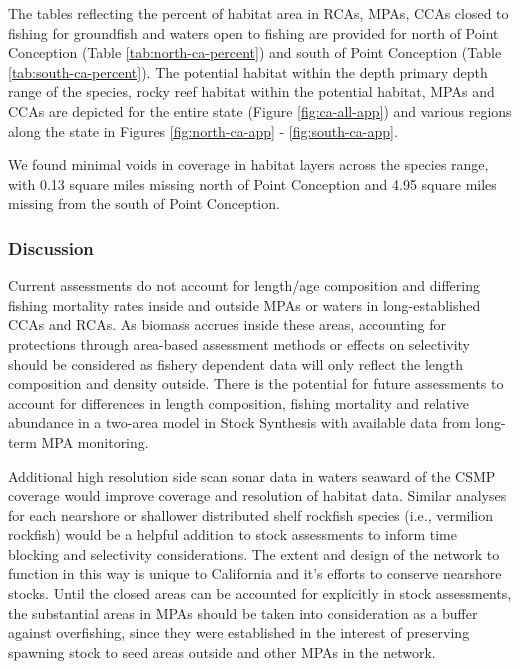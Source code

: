 \documentclass[11pt,
  english,
  a4paper,
]{article}
\begin{document}
The tables reflecting the percent of habitat area in RCAs, MPAs, CCAs closed to fishing for groundfish and waters open to fishing are provided for north of Point Conception (Table \ref{tab:north-ca-percent}) and south of Point Conception (Table \ref{tab:south-ca-percent}). The potential habitat within the depth primary depth range of the species, rocky reef habitat within the potential habitat, MPAs and CCAs are depicted for the entire state (Figure \ref{fig:ca-all-app}) and various regions along the state in Figures \ref{fig:north-ca-app} - \ref{fig:south-ca-app}.

\leavevmode\tagmcend\tagstructend\par


We found minimal voids in coverage in habitat layers across the species range, with 0.13 square miles missing north of Point Conception and 4.95 square miles missing from the south of Point Conception.

\leavevmode\tagmcend\tagstructend\par


\hypertarget{discussion}{%
\subsubsection{Discussion}\label{discussion}}

\leavevmode\tagmcend\tagstructend


Current assessments do not account for length/age composition and differing fishing mortality rates inside and outside MPAs or waters in long-established CCAs and RCAs. As biomass accrues inside these areas, accounting for protections through area-based assessment methods or effects on selectivity should be considered as fishery dependent data will only reflect the length composition and density outside. There is the potential for future assessments to account for differences in length composition, fishing mortality and relative abundance in a two-area model in Stock Synthesis with available data from long-term MPA monitoring.

\leavevmode\tagmcend\tagstructend\par


Additional high resolution side scan sonar data in waters seaward of the CSMP coverage would improve coverage and resolution of habitat data. Similar analyses for each nearshore or shallower distributed shelf rockfish species (i.e., vermilion rockfish) would be a helpful addition to stock assessments to inform time blocking and selectivity considerations. The extent and design of the network to function in this way is unique to California and it's efforts to conserve nearshore stocks. Until the closed areas can be accounted for explicitly in stock assessments, the substantial areas in MPAs should be taken into consideration as a buffer against overfishing, since they were established in the interest of preserving spawning stock to seed areas outside and other MPAs in the network.
\end{document}
